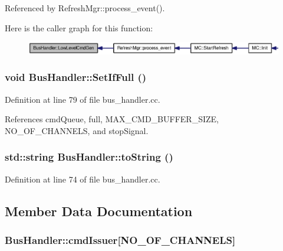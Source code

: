Referenced by RefreshMgr::process\_\-event().

Here is the caller graph for this function:\nopagebreak
\begin{figure}[H]
\begin{center}
\leavevmode
\includegraphics[width=329pt]{classBusHandler_2b8cd5f4be39270cf6abd4e6a64d45d0_icgraph}
\end{center}
\end{figure}
\subsubsection[{SetIfFull}]{\setlength{\rightskip}{0pt plus 5cm}void BusHandler::SetIfFull ()}\label{classBusHandler_ec754a189e4f6fe2a4644691e80c3891}




Definition at line 79 of file bus\_\-handler.cc.

References cmdQueue, full, MAX\_\-CMD\_\-BUFFER\_\-SIZE, NO\_\-OF\_\-CHANNELS, and stopSignal.
\subsubsection[{toString}]{\setlength{\rightskip}{0pt plus 5cm}std::string BusHandler::toString ()}\label{classBusHandler_892d4aa770091924a43ee446848db5e5}




Definition at line 74 of file bus\_\-handler.cc.

\subsection{Member Data Documentation}
\subsubsection[{cmdIssuer}]{ {\bf BusHandler::cmdIssuer}[{\bf NO\_\-OF\_\-CHANNELS}]}\label{classBusHandler_be8960744c8252a6e87e16cb4e053c27}




